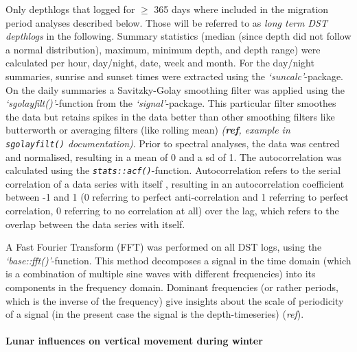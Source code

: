 \documentclass[
  authoryear,
  review,
  3p]{elsarticle}
\let\oldparagraph\paragraph
\renewcommand{\paragraph}[1]{\oldparagraph{#1}\mbox{}}
\begin{document}
Only depthlogs that logged for \(\geq\) 365 days where included in the
migration period analyses described below. Those will be referred to as
\emph{long term DST depthlogs} in the following. Summary statistics
(median (since depth did not follow a normal distribution), maximum,
minimum depth, and depth range) were calculated per hour, day/night,
date, week and month. For the day/night summaries, sunrise and sunset
times were extracted using the \emph{`suncalc'}-package. On the daily
summaries a Savitzky-Golay smoothing filter \citep[filter order \emph{p
= 1}, filter length \emph{n = 5}]{press_1990} was applied using the
\emph{`sgolayfilt()'}-function from the \emph{`signal'}-package. This
particular filter smoothes the data but retains spikes in the data
better than other smoothing filters like butterworth or averaging
filters (like rolling mean) \emph{(\textbf{ref}, example in
\texttt{sgolayfilt()} documentation)}. Prior to spectral analyses, the
data was centred and normalised, resulting in a mean of 0 and a sd of 1.
The autocorrelation was calculated using the
\emph{\texttt{stats::acf()}}-function. Autocorrelation refers to the
serial correlation of a data series with itself \citep{bartlett_1946},
resulting in an autocorrelation coefficient between -1 and 1 (0
referring to perfect anti-correlation and 1 referring to perfect
correlation, 0 referring to no correlation at all) over the lag, which
refers to the overlap between the data series with itself.

A Fast Fourier Transform (FFT) was performed on all DST logs, using the
\emph{`base::fft()'}-function. This method decomposes a signal in the
time domain (which is a combination of multiple sine waves with
different frequencies) into its components in the frequency domain.
Dominant frequencies (or rather periods, which is the inverse of the
frequency) give insights about the scale of periodicity of a signal (in
the present case the signal is the depth-timeseries) (\emph{ref}).

\hypertarget{lunar-influences-on-vertical-movement-during-winter}{%
\paragraph{Lunar influences on vertical movement during
winter}\label{lunar-influences-on-vertical-movement-during-winter}}
\end{document}
